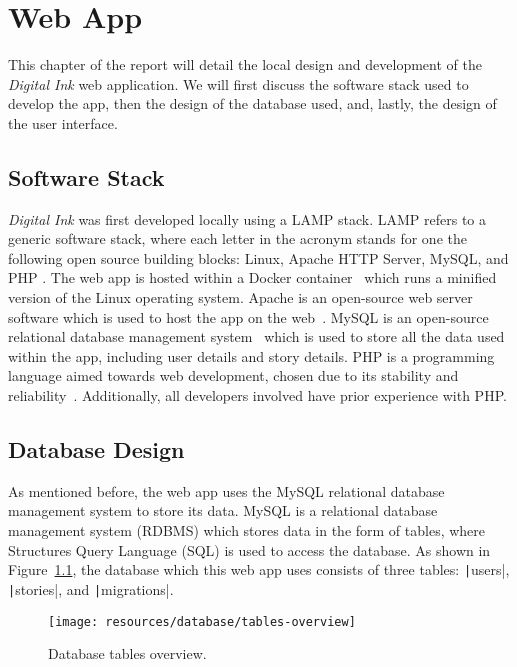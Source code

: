 \chapter{Web App}\label{ch:web-app}

This chapter of the report will detail the local design and development of the \textit{Digital Ink} web application.
We will first discuss the software stack used to develop the app, then the design of the database used, and, lastly, the design of the user interface.

\section{Software Stack}\label{sec:stack}

\textit{Digital Ink} was first developed locally using a LAMP stack.
LAMP refers to a generic software stack, where each letter in the acronym stands for one the following open source building blocks: Linux, Apache HTTP Server, MySQL, and PHP \citep{lee2003open}.
The web app is hosted within a Docker container~\citep{anderson2015docker} which runs a minified version of the Linux operating system.
Apache is an open-source web server software which is used to host the app on the web~\citep{fielding1997apache}.
MySQL is an open-source relational database management system~\citep{widenius2002mysql} which is used to store all the data used within the app, including user details and story details.
PHP is a programming language aimed towards web development, chosen due to its stability and reliability~\citep{lerdorf2002programming}.
Additionally, all developers involved have prior experience with PHP\@.

\section{Database Design}\label{sec:database}

As mentioned before, the web app uses the MySQL relational database management system to store its data.
MySQL is a relational database management system (RDBMS) which stores data in the form of tables, where Structures Query Language (SQL) is used to access the database.
As shown in Figure~\ref{fig:tables-overview}, the database which this web app uses consists of three tables: \texttt|users|, \texttt|stories|, and \texttt|migrations|.

\begin{figure}[!htbp]
    \centering
    \texttt{[image: resources/database/tables-overview]}
    \caption{Database tables overview.}
    \label{fig:tables-overview}
\end{figure}

